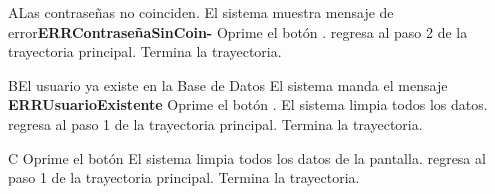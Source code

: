 		\begin{UCtrayectoriaA}{A}{Las contraseñas no coinciden.}
			\UCpaso El sistema muestra mensaje de error{\bf ERRContraseñaSinCoin-}
			\UCpaso[\UCactor]Oprime el botón .
			\UCpaso[\UCactor] regresa al paso 2 de la trayectoria principal.  
			\UCpaso[] Termina la trayectoria.
		\end{UCtrayectoriaA}
		
		
	\begin{UCtrayectoriaA}{B}{El usuario ya existe en la Base de Datos}
			\UCpaso El sistema manda el mensaje {\bf ERRUsuarioExistente}
			\UCpaso[\UCactor]Oprime el botón .
			\UCpaso El sistema limpia todos los datos. 
			\UCpaso[\UCactor] regresa al paso 1 de la trayectoria principal.  
			\UCpaso[] Termina la trayectoria.
		\end{UCtrayectoriaA}
		
		\begin{UCtrayectoriaA}{C}{}
			\UCpaso[\UCactor]Oprime el botón 
			\UCpaso El sistema limpia todos los datos de la pantalla. 
			\UCpaso[\UCactor] regresa al paso 1 de la trayectoria principal.  
			\UCpaso[] Termina la trayectoria.
		\end{UCtrayectoriaA}
		
